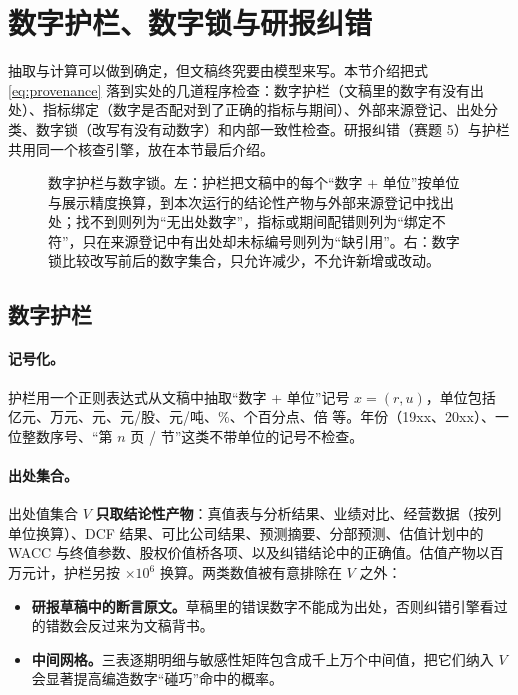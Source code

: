 \section{数字护栏、数字锁与研报纠错}
\label{sec:guards}

抽取与计算可以做到确定，但文稿终究要由模型来写。本节介绍把式 \eqref{eq:provenance} 落到实处的几道程序检查：数字护栏（文稿里的数字有没有出处）、指标绑定（数字是否配对到了正确的指标与期间）、外部来源登记、出处分类、数字锁（改写有没有动数字）和内部一致性检查。研报纠错（赛题 5）与护栏共用同一个核查引擎，放在本节最后介绍。

\begin{figure}[t]
  \centering
  \caption{数字护栏与数字锁。左：护栏把文稿中的每个“数字 + 单位”按单位与展示精度换算，到本次运行的结论性产物与外部来源登记中找出处；找不到则列为“无出处数字”，指标或期间配错则列为“绑定不符”，只在来源登记中有出处却未标编号则列为“缺引用”。右：数字锁比较改写前后的数字集合，只允许减少，不允许新增或改动。}
  \label{fig:guard}
\end{figure}

\subsection{数字护栏}
\label{sec:guard}

\paragraph{记号化。}护栏用一个正则表达式从文稿中抽取“数字 + 单位”记号 $x=(r,u)$，单位包括 亿元、万元、元、元/股、元/吨、\%、个百分点、倍 等。年份（19xx、20xx）、一位整数序号、“第 $n$ 页 / 节”这类不带单位的记号不检查。

\paragraph{出处集合。}出处值集合 $V$ \textbf{只取结论性产物}：真值表与分析结果、业绩对比、经营数据（按列单位换算）、DCF 结果、可比公司结果、预测摘要、分部预测、估值计划中的 WACC 与终值参数、股权价值桥各项、以及纠错结论中的正确值。估值产物以百万元计，护栏另按 $\times 10^6$ 换算。两类数值被有意排除在 $V$ 之外：
\begin{itemize}
  \item \textbf{研报草稿中的断言原文。}草稿里的错误数字不能成为出处，否则纠错引擎看过的错数会反过来为文稿背书。
  \item \textbf{中间网格。}三表逐期明细与敏感性矩阵包含成千上万个中间值，把它们纳入 $V$ 会显著提高编造数字“碰巧”命中的概率。
\end{itemize}

